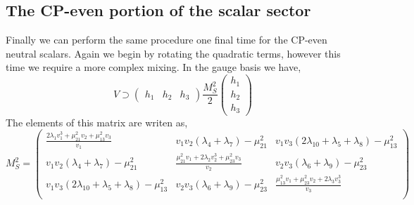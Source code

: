 \subsection{The CP-even portion of the scalar sector}

Finally we can perform the same procedure one final time for the CP-even neutral scalars. 
%
Again we begin by rotating the quadratic terms, however this time we require a more complex mixing. In the gauge basis we have,  
\begin{equation}
V \supset \left( \begin{array}{ccc} 
h_1 & h_2 & h_3 
\end{array} \right) 
\frac{M_S^2}{2} \left( \begin{array}{c}
h_1 \\ 
h_2 \\
h_3
\end{array} \right) 
\end{equation}
The elements of this matrix are writen as,
\begin{equation}
M_S^2 = 
\begin{pmatrix}
 \frac{2 \lambda_1 v_1^3 +\mu_{21}^2 v_2 + \mu_{13}^2 v_3}{v_1} & v_1  v_2 (\lambda_4+\lambda_7)-\mu_{21}^2 & v_1
   v_3 (2 \lambda_{10} + \lambda_5 + \lambda_8) - \mu_{13}^2 \\
 v_1 v_2 ( \lambda_4 +\lambda_7) - \mu_{21}^2 & \frac{\mu_{21}^2 v_1+2 \lambda_2 v_2^3 +\mu_{23}^2 v_3}{v_2} & v_2
   v_3 (\lambda_6+\lambda_9)-\mu_{23}^2 \\
 v_1 v_3 (2 \lambda_{10}+\lambda_5+\lambda_8)-\mu_{13}^2 & v_2 v_3 (\lambda_6+\lambda_9)-\mu_{23}^2 & \frac{\mu_{13}^2 v_1+\mu_{23}^2 v_2 +2 \lambda_3 v_3^3}{v_3} \\
\end{pmatrix}
\end{equation}

